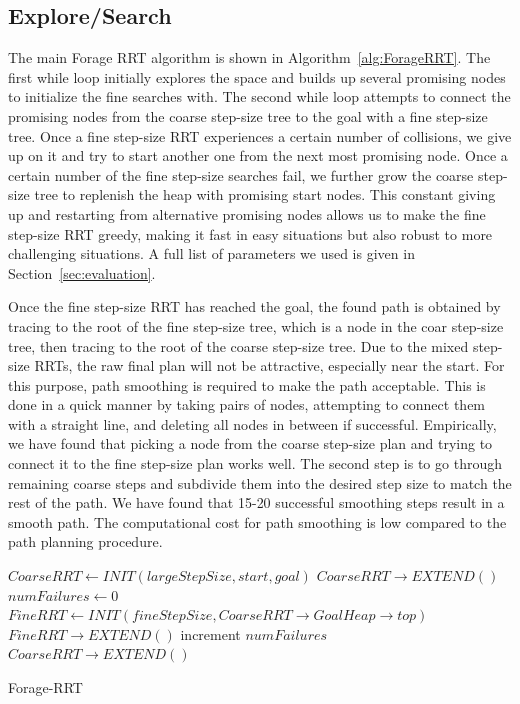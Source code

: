 \documentclass[conference]{IEEEtran}
\begin{document}
\subsection{Explore/Search}
The main Forage RRT algorithm is shown in Algorithm~\ref{alg:ForageRRT}. The
first while loop initially explores the space and builds up several promising 
nodes to initialize the fine searches with. The second while loop attempts to 
connect the promising nodes from the coarse step-size tree to the goal with a 
fine step-size tree. Once a fine step-size RRT experiences a certain number 
of collisions, we give up on it and try to start another one from the next 
most promising node. Once a certain number of the fine step-size searches fail, 
we further grow the coarse step-size tree to replenish the heap with promising 
start nodes. This constant giving up and restarting from alternative promising 
nodes allows us to make the fine step-size RRT greedy, making it fast in easy 
situations but also robust to more challenging situations. A full list of
parameters we used is given in Section~\ref{sec:evaluation}.

Once the fine step-size RRT has reached the goal, the found path is obtained
by tracing to the root of the fine step-size tree, which is a node in the
coar step-size tree, then tracing to the root of the coarse step-size tree.
Due to the mixed step-size RRTs, the raw final plan will not be attractive, 
especially near the start. For this purpose, path smoothing is required to 
make the path acceptable. This is done in a quick manner by taking pairs of
nodes, attempting to connect them with a straight line, and deleting all
nodes in between if successful. Empirically, we have found that
picking a node from the coarse step-size plan and trying to connect it to 
the fine step-size plan works well.  The second step is to go through
remaining coarse steps and subdivide them into the desired step size to
match the rest of the path.  We have found that 15-20 successful smoothing 
steps result in a smooth path.  The computational cost for path smoothing is
low compared to the path planning procedure.

\begin{algorithm}
  \label{alg:ForageRRT}
  \SetAlgoLined
  $CoarseRRT \leftarrow INIT(largeStepSize, start, goal)$\;
   {
	$CoarseRRT \rightarrow EXTEND()$\;
   }
   {
    $numFailures \leftarrow 0$\;
	$FineRRT \leftarrow INIT(fineStepSize, 
	                         CoarseRRT \rightarrow GoalHeap \rightarrow top)$\;
	 {
	  $FineRRT \rightarrow EXTEND()$\;
	 }
	increment $numFailures$ \;
	 {
	   {
		$CoarseRRT \rightarrow EXTEND()$\;
	   }
	 }
   }
  \caption{Forage-RRT}
\end{algorithm}
\end{document}
